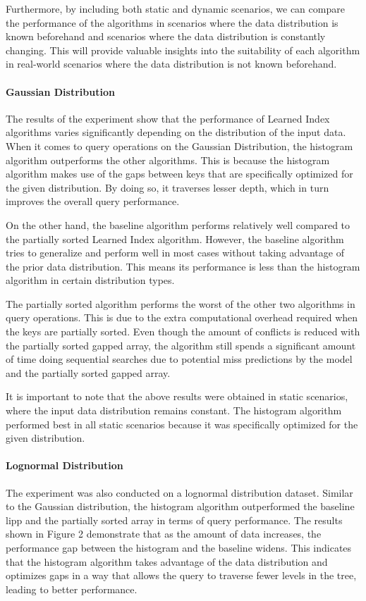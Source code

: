 \documentclass[11pt,a4paper]{article}
\newcommand{\learnindex}{\textsf{Learned Index}\xspace}
\begin{document}
Furthermore, by including both static and dynamic scenarios, we can compare the performance of the algorithms in scenarios where the data distribution is known beforehand and scenarios where the data distribution is constantly changing. This will provide valuable insights into the suitability of each algorithm in real-world scenarios where the data distribution is not known beforehand.

\paragraph{Gaussian Distribution}
The results of the experiment show that the performance of \learnindex algorithms varies significantly depending on the distribution of the input data. When it comes to query operations on the Gaussian Distribution, the histogram algorithm outperforms the other algorithms. This is because the histogram algorithm makes use of the gaps between keys that are specifically optimized for the given distribution. By doing so, it traverses lesser depth, which in turn improves the overall query performance.

On the other hand, the baseline algorithm performs relatively well compared to the partially sorted \learnindex algorithm. However, the baseline algorithm tries to generalize and perform well in most cases without taking advantage of the prior data distribution. This means its performance is less than the histogram algorithm in certain distribution types.

The partially sorted algorithm performs the worst of the other two algorithms in query operations. This is due to the extra computational overhead required when the keys are partially sorted. Even though the amount of conflicts is reduced with the partially sorted gapped array, the algorithm still spends a significant amount of time doing sequential searches due to potential miss predictions by the model and the partially sorted gapped array.

It is important to note that the above results were obtained in static scenarios, where the input data distribution remains constant. The histogram algorithm performed best in all static scenarios because it was specifically optimized for the given distribution. 

\paragraph{Lognormal Distribution}
The experiment was also conducted on a lognormal distribution dataset. Similar to the Gaussian distribution, the histogram algorithm outperformed the baseline \acrshort{lipp} and the partially sorted array in terms of query performance. The results shown in Figure 2 demonstrate that as the amount of data increases, the performance gap between the histogram and the baseline widens. This indicates that the histogram algorithm takes advantage of the data distribution and optimizes gaps in a way that allows the query to traverse fewer levels in the tree, leading to better performance.
\end{document}
